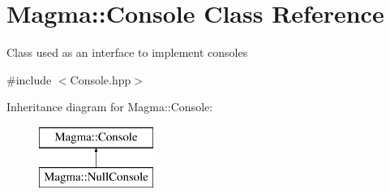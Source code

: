 \hypertarget{class_magma_1_1_console}{}\section{Magma\+:\+:Console Class Reference}
\label{class_magma_1_1_console}


Class used as an interface to implement consoles  




{\ttfamily \#include $<$Console.\+hpp$>$}

Inheritance diagram for Magma\+:\+:Console\+:\begin{figure}[H]
\begin{center}
\leavevmode
\includegraphics[height=2.000000cm]{class_magma_1_1_console}
\end{center}
\end{figure}
